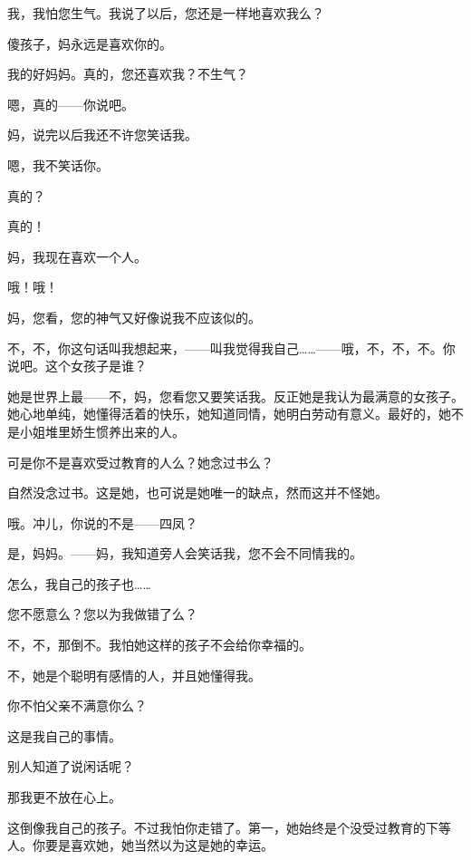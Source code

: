 我，我怕您生气。我说了以后，您还是一样地喜欢我么？

傻孩子，妈永远是喜欢你的。

我的好妈妈。真的，您还喜欢我？不生气？

嗯，真的——你说吧。

妈，说完以后我还不许您笑话我。

嗯，我不笑话你。

真的？

真的！

妈，我现在喜欢一个人。

哦！哦！

妈，您看，您的神气又好像说我不应该似的。

不，不，你这句话叫我想起来，——叫我觉得我自己……——哦，不，不，不。你说吧。这个女孩子是谁？

她是世界上最——不，妈，您看您又要笑话我。反正她是我认为最满意的女孩子。她心地单纯，她懂得活着的快乐，她知道同情，她明白劳动有意义。最好的，她不是小姐堆里娇生惯养出来的人。

可是你不是喜欢受过教育的人么？她念过书么？

自然没念过书。这是她，也可说是她唯一的缺点，然而这并不怪她。

哦。冲儿，你说的不是——四凤？

是，妈妈。——妈，我知道旁人会笑话我，您不会不同情我的。

怎么，我自己的孩子也……

您不愿意么？您以为我做错了么？

不，不，那倒不。我怕她这样的孩子不会给你幸福的。

不，她是个聪明有感情的人，并且她懂得我。

你不怕父亲不满意你么？

这是我自己的事情。

别人知道了说闲话呢？

那我更不放在心上。

这倒像我自己的孩子。不过我怕你走错了。第一，她始终是个没受过教育的下等人。你要是喜欢她，她当然以为这是她的幸运。

